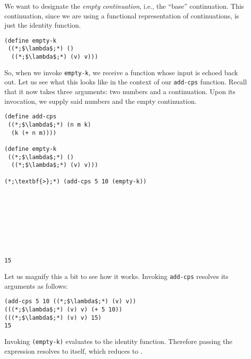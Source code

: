 We want to designate the \textit{empty continuation}, i.e., the ``base'' continuation. This continuation, since we are using a functional representation of continuations, is just the identity function.

\begin{cl}[]{}\begin{lstlisting}[language=MyScheme]
(define empty-k
 ((*;$\lambda$;*) ()
  ((*;$\lambda$;*) (v) v)))
\end{lstlisting}\end{cl}

So, when we invoke \texttt{empty-k}, we receive a function whose input is echoed back out. Let us see what this looks like in the context of our \texttt{add-cps} function. Recall that it now takes three arguments: two numbers and a continuation. Upon its invocation, we supply said numbers and the empty continuation.

\begin{cloast}[]{}\begin{lstlisting}[language=MyScheme]
(define add-cps
 ((*;$\lambda$;*) (n m k)
  (k (+ n m))))

(define empty-k
 ((*;$\lambda$;*) ()
  ((*;$\lambda$;*) (v) v)))

(*;\textbf{>};*) (add-cps 5 10 (empty-k))
\end{lstlisting}
\tcblower
\begin{lstlisting}[language=MyOutput]








15
\end{lstlisting}
\end{cloast}

Let us magnify this a bit to see how it works. Invoking \texttt{add-cps} resolves its arguments as follows:

\begin{cl}[]{}\begin{lstlisting}[language=MyScheme]
(add-cps 5 10 ((*;$\lambda$;*) (v) v))
(((*;$\lambda$;*) (v) v) (+ 5 10))
(((*;$\lambda$;*) (v) v) 15)
15
\end{lstlisting}\end{cl}

Invoking \texttt{(empty-k)} evaluates to the identity function. Therefore passing the expression  resolves to itself, which reduces to .

